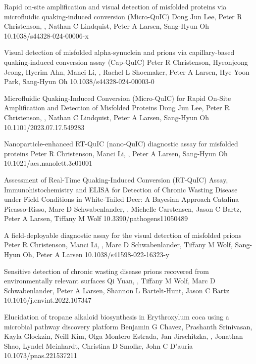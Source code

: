 \documentclass{resume}
\begin{document}
\begin{samepage}
            {Rapid on-site amplification and visual detection of misfolded proteins via microfluidic quaking-induced conversion (Micro-QuIC)}
            {Dong Jun Lee, Peter R Christenson, \me, Nathan C Lindquist, Peter A Larsen, Sang-Hyun Oh}
            {10.1038/s44328-024-00006-x}

            {Visual detection of misfolded alpha-synuclein and prions via capillary-based quaking-induced conversion assay (Cap-QuIC)}
            {Peter R Christenson, Hyeonjeong Jeong, Hyerim Ahn, Manci Li, \me, Rachel L Shoemaker, Peter A Larsen, Hye Yoon Park, Sang-Hyun Oh}
            {10.1038/s44328-024-00003-0}

            {Microfluidic Quaking-Induced Conversion (Micro-QuIC) for Rapid On-Site Amplification and Detection of Misfolded Proteins}
            {Dong Jun Lee, Peter R Christenson, \me, Nathan C Lindquist, Peter A Larsen, Sang-Hyun Oh}
            {10.1101/2023.07.17.549283}

            {Nanoparticle-enhanced RT-QuIC (nano-QuIC) diagnostic assay for misfolded proteins}
            {Peter R Christenson, Manci Li, \me, Peter A Larsen, Sang-Hyun Oh}
            {10.1021/acs.nanolett.3c01001}

            {Assessment of Real-Time Quaking-Induced Conversion (RT-QuIC) Assay, Immunohistochemistry and ELISA for Detection of Chronic Wasting Disease under Field Conditions in White-Tailed Deer: A Bayesian Approach}
            {Catalina Picasso-Risso, Marc D Schwabenlander, \me, Michelle Carstensen, Jason C Bartz, Peter A Larsen, Tiffany M Wolf}
            {10.3390/pathogens11050489}

            {A field-deployable diagnostic assay for the visual detection of misfolded prions}
            {Peter R Christenson, Manci Li, \me, Marc D Schwabenlander, Tiffany M Wolf, Sang-Hyun Oh, Peter A Larsen}
            {10.1038/s41598-022-16323-y}

            {Sensitive detection of chronic wasting disease prions recovered from environmentally relevant surfaces}
            {Qi Yuan, \me, Tiffany M Wolf, Marc D Schwabenlander, Peter A Larsen, Shannon L Bartelt-Hunt, Jason C Bartz}
            {10.1016/j.envint.2022.107347}

            {Elucidation of tropane alkaloid biosynthesis in Erythroxylum coca using a microbial pathway discovery platform}
            {Benjamin G Chavez, Prashanth Srinivasan, Kayla Glockzin, Neill Kim, Olga Montero Estrada, Jan Jirschitzka, \me, Jonathan Shao, Lyndel Meinhardt, Christina D Smolke, John C D’auria}
            {10.1073/pnas.221537211}


\end{samepage}
\end{document}
